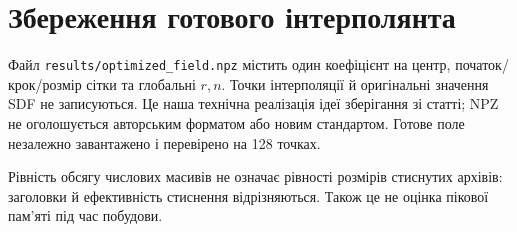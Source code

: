 \documentclass[11pt,a4paper]{article}
\begin{document}
\section*{Збереження готового інтерполянта}
Файл \texttt{results/optimized\_field.npz} містить один коефіцієнт
на центр, початок/крок/розмір сітки та глобальні $r,n$.
Точки інтерполяції й оригінальні значення SDF не записуються.
Це наша технічна реалізація ідеї зберігання зі статті;
NPZ не оголошується авторським форматом або новим стандартом.
Готове поле незалежно завантажено і перевірено на 128 точках.
\begin{center}\small{}\end{center}

Рівність обсягу числових масивів не означає рівності розмірів
стиснутих архівів: заголовки й ефективність стиснення відрізняються.
Також це не оцінка пікової пам'яті під час побудови.
\end{document}
